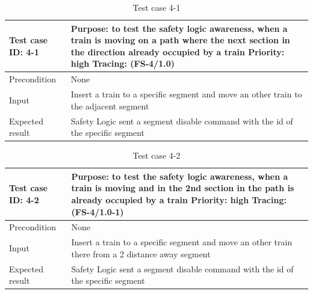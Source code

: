 \begin{table}[H]
	\caption{Test case 4-1}
	\label{table:TCase-FS4-1}
	\begin{center}
		\renewcommand{\arraystretch}{1.8}
		\begin{tabu} 
			to 0.9 \textwidth
			{  X[0.4, c] X[c] }
			\toprule
			Test case ID: 4-1 & Purpose: to test the safety logic awareness, when a train is moving on a path where the next section in the direction already occupied by a train \newline Priority: high \newline Tracing: (FS-4/1.0)\\ \midrule
			Precondition & None  \\
			Input & Insert a train to a specific segment and move an other train to the adjacent segment\\
			Expected result & Safety Logic sent a segment disable command with the id of the specific segment \\ \bottomrule
		\end{tabu}
	\end{center}
\end{table} 


\begin{table}[H]
	\caption{Test case 4-2}
	\label{table:TCase-FS4-2}
	\begin{center}
		\renewcommand{\arraystretch}{1.8}
		\begin{tabu} 
			to 0.9 \textwidth
			{  X[0.4, c] X[c] }
			\toprule
			Test case ID: 4-2 & Purpose: to test the safety logic awareness, when a train is moving and in the 2nd section in the path is already occupied by a train \newline Priority: high \newline Tracing: (FS-4/1.0-1)\\ \midrule
			Precondition & None  \\
			Input & Insert a train to a specific segment and move an other train there from a 2 distance away segment\\
			Expected result & Safety Logic sent a segment disable command with the id of the specific segment \\ \bottomrule
		\end{tabu}
	\end{center}
\end{table} 

